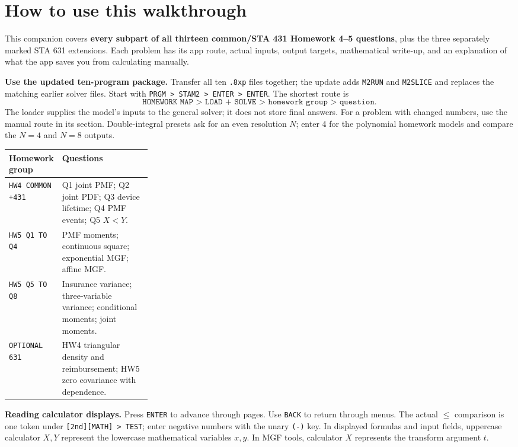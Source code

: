 \section*{How to use this walkthrough}
This companion covers \textbf{every subpart of all thirteen common/STA 431 Homework 4--5 questions}, plus the three separately marked STA 631 extensions. Each problem has its app route, actual inputs, output targets, mathematical write-up, and an explanation of what the app saves you from calculating manually.

\textbf{Use the updated ten-program package.} Transfer all ten \texttt{.8xp} files together; the update adds \texttt{M2RUN} and \texttt{M2SLICE} and replaces the matching earlier solver files. Start with \texttt{PRGM > STAM2 > ENTER > ENTER}. The shortest route is
\[
\texttt{HOMEWORK MAP > LOAD + SOLVE > homework group > question}.
\]
The loader supplies the model's inputs to the general solver; it does not store final answers. For a problem with changed numbers, use the manual route in its section. Double-integral presets ask for an even resolution $N$; enter 4 for the polynomial homework models and compare the $N=4$ and $N=8$ outputs.

\begin{tabularx}{\linewidth}{@{}p{0.28\linewidth}X@{}}
\toprule Homework group & Questions\\\midrule
\texttt{HW4 COMMON +431} & Q1 joint PMF; Q2 joint PDF; Q3 device lifetime; Q4 PMF events; Q5 $X<Y$.\\
\texttt{HW5 Q1 TO Q4} & PMF moments; continuous square; exponential MGF; affine MGF.\\
\texttt{HW5 Q5 TO Q8} & Insurance variance; three-variable variance; conditional moments; joint moments.\\
\texttt{OPTIONAL 631} & HW4 triangular density and reimbursement; HW5 zero covariance with dependence.\\\bottomrule
\end{tabularx}

\textbf{Reading calculator displays.} Press \texttt{ENTER} to advance through pages. Use \texttt{BACK} to return through menus. The actual $\le$ comparison is one token under \texttt{[2nd][MATH] > TEST}; enter negative numbers with the unary \texttt{(-)} key. In displayed formulas and input fields, uppercase calculator $X,Y$ represent the lowercase mathematical variables $x,y$. In MGF tools, calculator $X$ represents the transform argument $t$.

